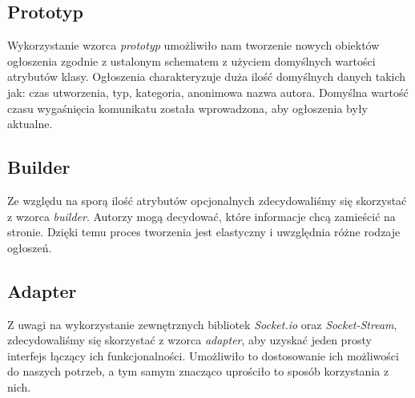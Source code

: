 \documentclass{sprawozdanie-agh}
\begin{document}
		\subsection{Prototyp}
			Wykorzystanie wzorca \textit{prototyp} umożliwiło nam tworzenie nowych obiektów ogłoszenia zgodnie z ustalonym schematem z użyciem domyślnych wartości atrybutów klasy. Ogłoszenia charakteryzuje duża ilość domyślnych danych takich jak: czas utworzenia, typ, kategoria, anonimowa nazwa autora. Domyślna wartość czasu wygaśnięcia komunikatu została wprowadzona, aby ogłoszenia były aktualne. 
			\subsection{Builder}
			Ze względu na sporą ilość atrybutów opcjonalnych zdecydowaliśmy się skorzystać z wzorca \textit{builder}. Autorzy mogą decydować, które informacje chcą zamieścić na stronie. Dzięki temu proces tworzenia jest elastyczny i uwzględnia różne rodzaje ogłoszeń. 
			\subsection{Adapter}
			Z uwagi na wykorzystanie zewnętrznych bibliotek
			\textit{Socket.io} oraz \textit{Socket-Stream}, zdecydowaliśmy się skorzystać z wzorca \textit{adapter}, aby uzyskać jeden prosty interfejs łączący ich funkcjonalności. Umożliwiło to dostosowanie ich możliwości do naszych potrzeb, a tym samym znacząco uprościło to sposób korzystania z nich.
		
\end{document}
